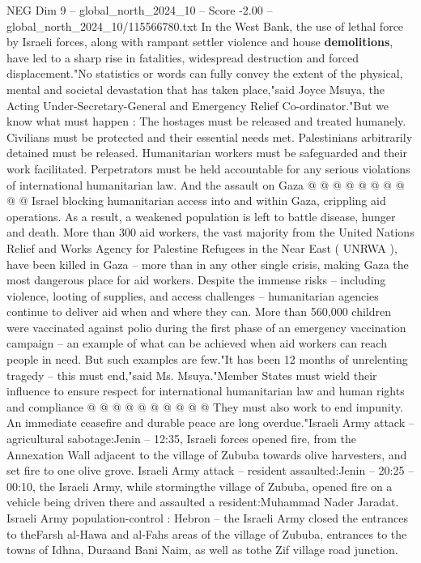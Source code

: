 \begin{textsample}{NEG Dim 9 – global\_north\_2024\_10 – Score -2.00 – global\_north\_2024\_10/115566780.txt}
In the West Bank, the use of lethal force by Israeli forces, along with rampant settler violence and house \textbf{demolitions}, have led to a sharp rise in fatalities, widespread destruction and forced displacement."No statistics or words can fully convey the extent of the physical, mental and societal devastation that has taken place,"said Joyce Msuya, the Acting Under-Secretary-General and Emergency Relief Co-ordinator."But we know what must happen : The hostages must be released and treated humanely.
Civilians must be protected and their essential needs met.
Palestinians arbitrarily detained must be released.
Humanitarian workers must be safeguarded and their work facilitated.
Perpetrators must be held accountable for any serious violations of international humanitarian law.
And the assault on Gaza @ @ @ @ @ @ @ @ @ @ Israel blocking humanitarian access into and within Gaza, crippling aid operations.
As a result, a weakened population is left to battle disease, hunger and death.
More than 300 aid workers, the vast majority from the United Nations Relief and Works Agency for Palestine Refugees in the Near East ( UNRWA ), have been killed in Gaza -- more than in any other single crisis, making Gaza the most dangerous place for aid workers.
Despite the immense risks -- including violence, looting of supplies, and access challenges -- humanitarian agencies continue to deliver aid when and where they can.
More than 560,000 children were vaccinated against polio during the first phase of an emergency vaccination campaign -- an example of what can be achieved when aid workers can reach people in need.
But such examples are few."It has been 12 months of unrelenting tragedy -- this must end,"said Ms.
Msuya."Member States must wield their influence to ensure respect for international humanitarian law and human rights and compliance @ @ @ @ @ @ @ @ @ @ They must also work to end impunity.
An immediate ceasefire and durable peace are long overdue."Israeli Army attack -- agricultural sabotage:Jenin -- 12:35, Israeli forces opened fire, from the Annexation Wall adjacent to the village of Zububa towards olive harvesters, and set fire to one olive grove.
Israeli Army attack -- resident assaulted:Jenin -- 20:25 -- 00:10, the Israeli Army, while stormingthe village of Zububa, opened fire on a vehicle being driven there and assaulted a resident:Muhammad Nader Jaradat.
Israeli Army population-control : Hebron -- the Israeli Army closed the entrances to theFarsh al-Hawa and al-Fahs areas of the village of Zububa, entrances to the towns of Idhna, Duraand Bani Naim, as well as tothe Zif village road junction.

\end{textsample}
